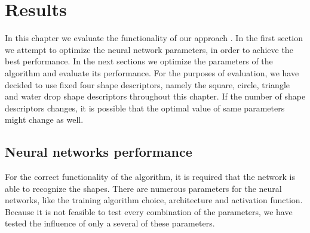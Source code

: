 \chapter{Results}
In this chapter we evaluate the functionality of our approach . In the first section\XX{,} we attempt to optimize  the neural network parameters, in order to achieve the best performance. In the next sections\XX{,} we optimize the parameters of the algorithm and evaluate its performance. For the purposes of evaluation, we have decided to use fixed four shape descriptors, namely the square, circle, triangle and water drop shape descriptors throughout this chapter. If the number of shape descriptors changes, it is possible that the optimal value of same parameters might change as well.  

\section{Neural networks performance}
For the correct functionality of the algorithm, it is required that the network is able to recognize the shapes. There are numerous parameters for the neural networks, like the training algorithm choice, architecture and activation function. Because it is not feasible to test every combination of the parameters, we have tested the influence of only a several of these parameters.

